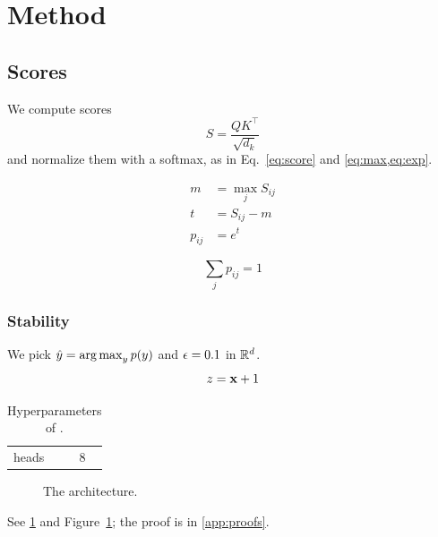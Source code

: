 \section{Method}
\label{sec:method}
\subsection{Scores}
We compute scores
\begin{equation}
  S = \frac{Q K^\top}{\sqrt{d_k}} \label{eq:score}
\end{equation}
and normalize them with a softmax, as in Eq.~\eqref{eq:score} and \cref{eq:max,eq:exp}.

\begin{align}
  m &= \max_j S_{ij} \label{eq:max} \\
  t &= S_{ij} - m \nonumber \\
  p_{ij} &= e^{t} \label{eq:exp}
\end{align}

\begin{equation*}
  \sum_j p_{ij} = 1
\end{equation*}
\subsubsection{Stability}
We pick $\hat{y} = \operatorname*{arg\,max}_y p(y)$ and $\epsilon = 0.1$ in $\mathbb{R}^{d}$.
\[ z = \mathbf{x} + 1 \]

\begin{table}[t]
  \centering
  \caption{Hyperparameters of \model.}
  \label{tab:hp}
  \begin{tabular}{ll} heads & 8 \\ \end{tabular}
\end{table}

\begin{figure}
  \caption[short]{The \model{} architecture.}\label{fig:arch}
\end{figure}

See \cref{tab:hp} and Figure~\ref{fig:arch}; the proof is in \cref{app:proofs}.
